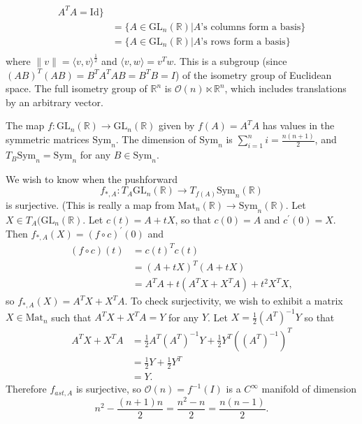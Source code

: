 \begin{xmpl}
\begin{enumerate}
{\begin{align*}
            A^T A = \mathrm{Id}
         \} \\
      &= \{ A \in \mathrm{GL}_n(\mathbb{R}) \vert
            \text{$A$'s columns form a basis}
         \} \\
      &= \{ A \in \mathrm{GL}_n(\mathbb{R}) \vert
            \text{$A$'s rows form a basis}
         \} \\
      \end{align*}
      where $\|v\| = \langle v, v \rangle^{\frac{1}{2}}$ and
      $\langle v, w \rangle = v^T w$. This is a subgroup (since
      $(AB)^T(AB) = B^T A^T A B = B^T B = I$) of the
      isometry group of Euclidean space.
      The full isometry group of $\mathbb{R}^n$ is
      $\mathcal{O}(n) \ltimes \mathbb{R}^n$, which includes
      translations by an arbitrary vector.

      The map $f: \mathrm{GL}_n(\mathbb{R}) \to
      \mathrm{GL}_n(\mathbb{R})$ given by $f(A) = A^T A$ has values in
      the symmetric matrices $\mathrm{Sym}_n$. The dimension of
      $\mathrm{Sym}_n$ is $\sum_{i=1}^n i = \frac{n(n+1)}{2}$, and
      $T_B \mathrm{Sym}_n = \mathrm{Sym}_n$ for any $B \in
      \mathrm{Sym}_n$.

      We wish to know when the pushforward
      $$
        f_{\ast, A} :
            T_A \mathrm{GL}_n(\mathbb{R})
        \to T_{f(A)} \mathrm{Sym}_n(\mathbb{R})
      $$
      is surjective. (This is really a map from
      $\mathrm{Mat}_n(\mathbb{R}) \to \mathrm{Sym}_n(\mathbb{R})$.
      Let $X \in T_A(\mathrm{GL}_n(\mathbb{R})$. Let
      $c(t) = A + tX$, so that $c(0) = A$ and $c^\prime(0) = X$. Then
      $f_{\ast, A}(X) = (f \circ c)^\prime(0)$ and
      \begin{align*}
         (f \circ c)(t)
      &= c(t)^T c(t) \\
      &= (A + tX)^T(A + tX) \\
      &= A^TA + t(A^T X + X^T A) + t^2 X^T X,
      \end{align*}
      so $f_{\ast, A}(X) = A^T X + X^T A$. To check surjectivity, we
      wish to exhibit a matrix $X \in \mathrm{Mat}_n$ such that
      $A^T X + X^T A = Y$ for any $Y$. Let
      $X = \frac{1}{2} (A^T)^{-1} Y$ so that
      \begin{align*}
         A^T X + X^T A
      &= \frac{1}{2}
           A^T (A^T)^{-1} Y
       + \frac{1}{2}
           Y^T((A^T)^{-1})^T \\
      &= \frac{1}{2} Y + \frac{1}{2} Y^T \\
      &= Y.
      \end{align*}
      Therefore $f_{ast, A}$ is surjective, so
      $\mathcal{O}(n) = f^{-1}(I)$ is a $C^\infty$ manifold of
      dimension
      $$
        n^2 - \frac{(n+1)n}{2}
      = \frac{n^2 - n}{2}
      = \frac{n(n-1)}{2}.
      $$
    }
  \end{enumerate}
\end{xmpl}
